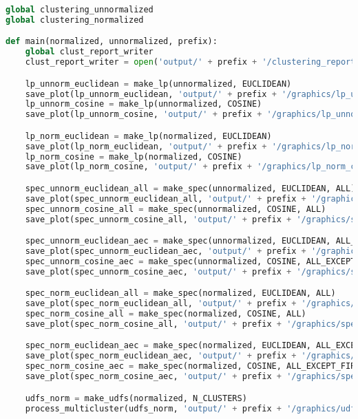 \begin{lstlisting}[columns=fullflexible,language=Python]
global clustering_unnormalized
global clustering_normalized

def main(normalized, unnormalized, prefix):
    global clust_report_writer
    clust_report_writer = open('output/' + prefix + '/clustering_reports/fs_report.txt', 'w')

    lp_unnorm_euclidean = make_lp(unnormalized, EUCLIDEAN)
    save_plot(lp_unnorm_euclidean, 'output/' + prefix + '/graphics/lp_unnorm_euclidean.png')
    lp_unnorm_cosine = make_lp(unnormalized, COSINE)
    save_plot(lp_unnorm_cosine, 'output/' + prefix + '/graphics/lp_unnorm_cosine.png')

    lp_norm_euclidean = make_lp(normalized, EUCLIDEAN)
    save_plot(lp_norm_euclidean, 'output/' + prefix + '/graphics/lp_norm_euclidean.png')
    lp_norm_cosine = make_lp(normalized, COSINE)
    save_plot(lp_norm_cosine, 'output/' + prefix + '/graphics/lp_norm_cosine.png')

    spec_unnorm_euclidean_all = make_spec(unnormalized, EUCLIDEAN, ALL)
    save_plot(spec_unnorm_euclidean_all, 'output/' + prefix + '/graphics/spec_unnorm_euclidean.png')
    spec_unnorm_cosine_all = make_spec(unnormalized, COSINE, ALL)
    save_plot(spec_unnorm_cosine_all, 'output/' + prefix + '/graphics/spec_unnorm_cosine.png')

    spec_unnorm_euclidean_aec = make_spec(unnormalized, EUCLIDEAN, ALL_EXCEPT_FIRST)
    save_plot(spec_unnorm_euclidean_aec, 'output/' + prefix + '/graphics/spec_unnorm_euclidean_no_first.png')
    spec_unnorm_cosine_aec = make_spec(unnormalized, COSINE, ALL_EXCEPT_FIRST)
    save_plot(spec_unnorm_cosine_aec, 'output/' + prefix + '/graphics/spec_unnorm_cosine_no_first.png')

    spec_norm_euclidean_all = make_spec(normalized, EUCLIDEAN, ALL)
    save_plot(spec_norm_euclidean_all, 'output/' + prefix + '/graphics/spec_norm_euclidean.png')
    spec_norm_cosine_all = make_spec(normalized, COSINE, ALL)
    save_plot(spec_norm_cosine_all, 'output/' + prefix + '/graphics/spec_norm_cosine.png')

    spec_norm_euclidean_aec = make_spec(normalized, EUCLIDEAN, ALL_EXCEPT_FIRST)
    save_plot(spec_norm_euclidean_aec, 'output/' + prefix + '/graphics/spec_norm_euclidean_no_first.png')
    spec_norm_cosine_aec = make_spec(normalized, COSINE, ALL_EXCEPT_FIRST)
    save_plot(spec_norm_cosine_aec, 'output/' + prefix + '/graphics/spec_norm_cosine_no_first.png')

    udfs_norm = make_udfs(normalized, N_CLUSTERS)
    process_multicluster(udfs_norm, 'output/' + prefix + '/graphics/udfs_norm_1c.png')


\end{lstlisting}
